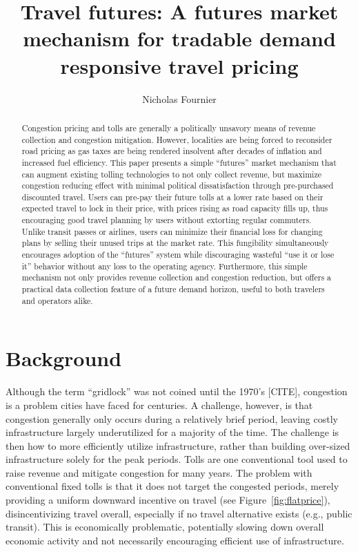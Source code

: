 \documentclass{article}
\title{Travel futures: A futures market mechanism for tradable demand responsive travel pricing}
\author{Nicholas Fournier}
\date{\usdate}
\begin{document}
\maketitle

\begin{abstract}
Congestion pricing and tolls are generally a politically unsavory means of revenue collection and congestion mitigation. However, localities are being forced to reconsider road pricing as gas taxes are being rendered insolvent after decades of inflation and increased fuel efficiency. This paper presents a simple ``futures'' market mechanism that can augment existing tolling technologies to not only collect revenue, but maximize congestion reducing effect with minimal political dissatisfaction through pre-purchased discounted travel. Users can pre-pay their future tolls at a lower rate based on their expected travel to lock in their price, with prices rising as road capacity fills up, thus encouraging good travel planning by users without extorting regular commuters. Unlike transit passes or airlines, users can minimize their financial loss for changing plans by selling their unused trips at the market rate. This fungibility simultaneously encourages adoption of the ``futures'' system while discouraging wasteful ``use it or lose it'' behavior without any loss to the operating agency. Furthermore, this simple mechanism not only provides revenue collection and congestion reduction, but offers a practical data collection feature of a future demand horizon, useful to both travelers and operators alike.
\vfill
\end{abstract}

\newpage

\section{Background}
Although the term ``gridlock'' was not coined until the 1970's [CITE], congestion is a problem cities have faced for centuries. A challenge, however, is that congestion generally only occurs during a relatively brief period, leaving costly infrastructure largely underutilized for a majority of the time. The challenge is then how to more efficiently utilize infrastructure, rather than building over-sized infrastructure solely for the peak periods. Tolls are one conventional tool used to raise revenue and mitigate congestion for many years. The problem with conventional fixed tolls is that it does not target the congested periods, merely providing a uniform downward incentive on travel (see Figure~\ref{fig:flatprice}), disincentivizing travel overall, especially if no travel alternative exists (e.g., public transit). This is economically problematic, potentially slowing down overall economic activity and not necessarily encouraging efficient use of infrastructure. 
\end{document}
